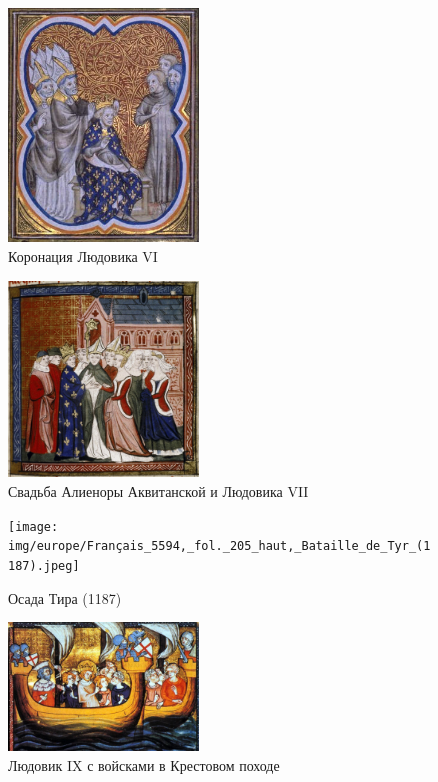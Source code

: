 \begin{figure}[ht]
    \centering
    \includegraphics[width=0.45\textwidth]{img/europe/LudvikVIFrr.jpg}
    \caption{Коронация Людовика VI}
    \label{fig:corona}
\end{figure}

\begin{figure}[ht]
    \centering
    \includegraphics[width=0.45\textwidth]{img/europe/aleonora.jpg}
    \caption{Свадьба Алиеноры Аквитанской и Людовика VII}
    \label{fig:marriage}
\end{figure}

\begin{figure}[ht]
    \centering
    \texttt{[image: img/europe/Français\_5594,\_fol.\_205\_haut,\_Bataille\_de\_Tyr\_(1187).jpeg]}
    \caption{Осада Тира (1187)}
    \label{fig:tyr}
\end{figure}

\begin{figure}[ht]
    \centering
    \includegraphics[width=0.45\textwidth]{img/europe/Seventh_crusade.jpg}
    \caption{Людовик IX с войсками в Крестовом походе}
    \label{fig:crusaders}
\end{figure}
